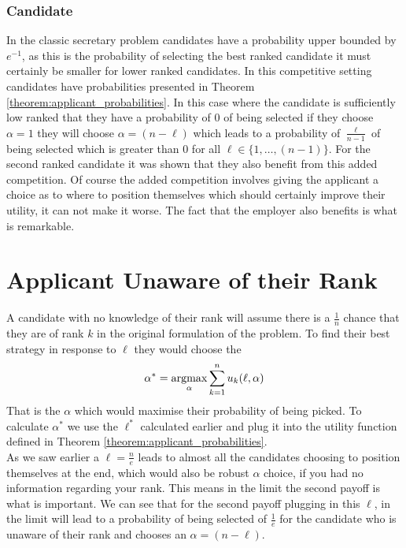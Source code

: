 \documentclass{article}
\newcommand{\argmax}{\operatornamewithlimits{argmax}} %
\begin{document}
\subsubsection{Candidate}

In the classic secretary problem candidates have a probability upper bounded by $e^{-1}$, as this is the probability of selecting the best ranked candidate it must certainly be smaller for lower ranked candidates. In this competitive setting candidates have probabilities presented in Theorem \ref{theorem:applicant_probabilities}. In this case where the candidate is sufficiently low ranked that they have a probability of 0 of being selected if they choose $\alpha=1$ they will choose $\alpha=(n-\ell)$ which leads to a probability of $\frac{\ell}{n-1}$ of being selected which is greater than 0 for all $\ell \in \{ 1, \ldots, (n-1) \} $. For the second ranked candidate it was shown that they also benefit from this added competition. Of course the added competition involves giving the applicant a choice as to where to position themselves which should certainly improve their utility, it can not make it worse. The fact that the employer also benefits is what is remarkable.

\section{Applicant Unaware of their Rank}

A candidate with no knowledge of their rank will assume there is a $\frac{1}{n}$ chance that they are of rank $k$ in the original formulation of the problem. To find their best strategy in response to $\ell$ they would choose the 
$$ \alpha^* = \argmax_{\alpha} \sum_{k=1}^{n} u_k(\ell, \alpha) $$
That is the $\alpha$ which would maximise their probability of being picked. To calculate $\alpha^*$ we use the $\ell^*$ calculated earlier and plug it into the utility function defined in Theorem \ref{theorem:applicant_probabilities}.
\\[2ex]
As we saw earlier a $\ell=\frac{n}{e}$ leads to almost all the candidates choosing to position themselves at the end, which would also be robust $\alpha$ choice, if you had no information regarding your rank. This means in the limit the second payoff is what is important. We can see that for the second payoff plugging in this $\ell$, in the limit will lead to a probability of being selected of $\frac{1}{e}$ for the candidate who is unaware of their rank and chooses an $\alpha=(n-\ell)$.
\end{document}
